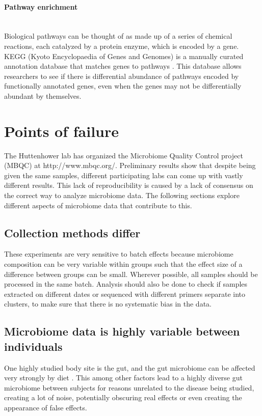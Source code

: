 \FloatBarrier

\paragraph{Pathway enrichment}\mbox{}\\
Biological pathways can be thought of as made up of a series of chemical reactions, each catalyzed by a protein enzyme, which is encoded by a gene. KEGG (Kyoto Encyclopaedia of Genes and Genomes) is a manually curated annotation database that matches genes to pathways \cite{kanehisa2000kegg}. This database allows researchers to see if there is differential abundance of pathways encoded by functionally annotated genes, even when the genes may not be differentially abundant by themselves.

\section{Points of failure}
The Huttenhower lab has organized the Microbiome Quality Control project (MBQC) at http://www.mbqc.org/. Preliminary results show that despite being given the same samples, different participating labs can come up with vastly different results. This lack of reproducibility is caused by a lack of consensus on the correct way to analyze microbiome data. The following sections explore different aspects of microbiome data that contribute to this.

\subsection{Collection methods differ}
These experiments are very sensitive to batch effects because microbiome composition can be very variable within groups such that the effect size of a difference between groups can be small. Wherever possible, all samples should be processed in the same batch. Analysis should also be done to check if samples extracted on different dates or sequenced with different primers separate into clusters, to make sure that there is no systematic bias in the data.

\subsection{Microbiome data is highly variable between individuals}
One highly studied body site is the gut, and the gut microbiome can be affected very strongly by diet \cite{turnbaugh2009effect}. This among other factors lead to a highly diverse gut microbiome between subjects for reasons unrelated to the disease being studied, creating a lot of noise, potentially obscuring real effects or even creating the appearance of false effects.


